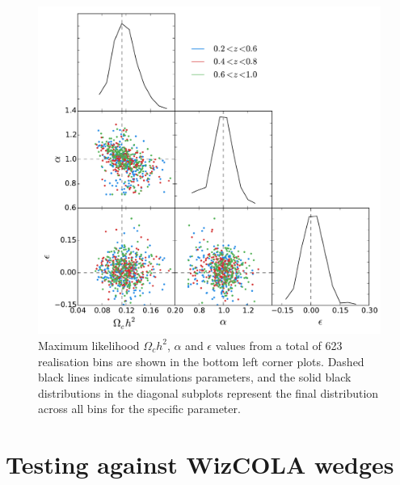 \documentclass[titlesmallcaps, examinerscopy, copyrightpage]{uqthesis}
\begin{document}
\begin{figure}[h!]
  \begin{center}
    \includegraphics[width=\textwidth]{images/mpDist2.pdf}
  \end{center}
  \caption{Maximum likelihood $\Omega_c h^2$, $\alpha$ and $\epsilon$ values from a total of 623 realisation bins are shown in the bottom left corner plots. Dashed black lines indicate simulations parameters, and the solid black distributions in the diagonal subplots represent the final distribution across all bins for the specific parameter.}
  \label{fig:mpDist2}
\end{figure}


\newpage \phantom{blabla} \clearpage

\section{Testing against WizCOLA wedges}
\end{document}
